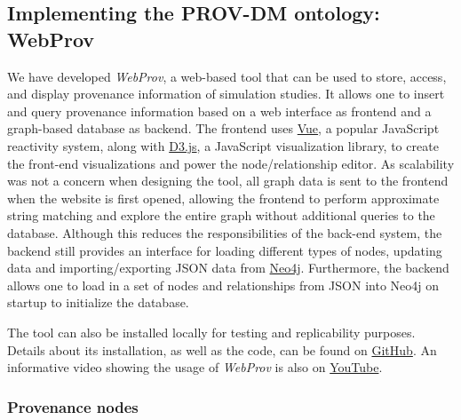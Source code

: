 \documentclass[10pt,letterpaper]{article}
\newcommand{\webprov}{\textit{WebProv}}
\begin{document}

\subsection*{Implementing the PROV-DM ontology: WebProv}

We have developed \webprov{}, a web-based tool that can be used to store, access, and display provenance information of simulation studies.
It allows one to insert and query provenance information based on a web interface as frontend and a graph-based database as backend.
The frontend uses \href{https://vuejs.org/}{Vue}, a popular JavaScript reactivity system, along with \href{https://d3js.org/}{D3.js}, a JavaScript visualization library, to create the front-end visualizations and power the node/relationship editor.
As scalability was not a concern when designing the tool, all graph data is sent to the frontend when the website is first opened, allowing the frontend to perform approximate string matching and explore the entire graph without additional queries to the database.
Although this reduces the responsibilities of the back-end system, the backend still provides an interface for loading different types of nodes, updating data and importing/exporting JSON data from \href{https://neo4j.com/}{Neo4j}.
Furthermore, the backend allows one to load in a set of nodes and relationships from JSON into Neo4j on startup to initialize the database.


The tool can also be installed locally for testing and replicability purposes.
Details about its installation, as well as the code, can be found on \href{https://github.com/SFB-ELAINE/WebProv}{GitHub}.
An informative video showing the usage of \webprov{} is also on \href{https://youtu.be/UzwHtptkYOU}{YouTube}.


\subsubsection*{Provenance nodes}
\end{document}
